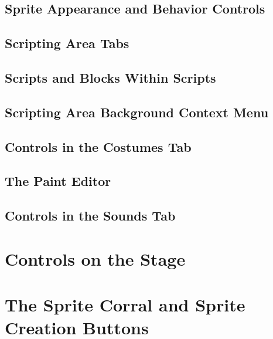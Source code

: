 \documentclass{report}
\begin{document}
\subsection{Sprite Appearance and Behavior Controls}
\subsection{Scripting Area Tabs}
\subsection{Scripts and Blocks Within Scripts}
\subsection{Scripting Area Background Context Menu}
\subsection{Controls in the Costumes Tab}
\subsection{The Paint Editor}
\subsection{Controls in the Sounds Tab}
\section{Controls on the Stage}
\section{The Sprite Corral and Sprite Creation Buttons}
\end{document}
